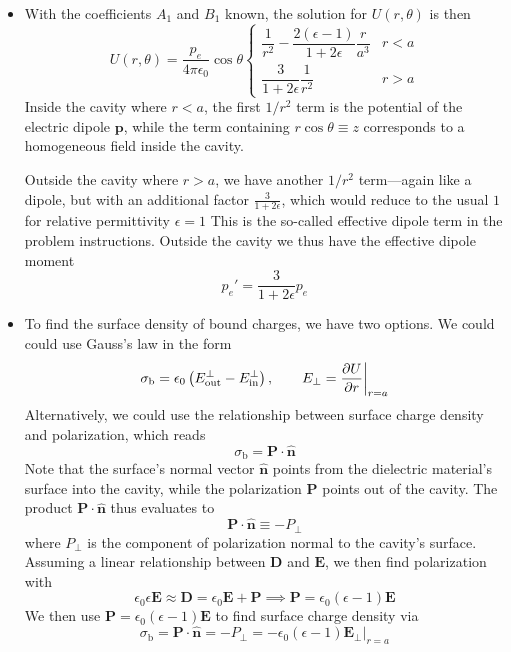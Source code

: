 \documentclass[11pt, a4paper]{article}
\renewcommand{\vec}[1]{\bm{#1}} %
\newcommand{\uvec}[1]{\hat{\vec{#1}}} %
\newcommand{\E}{\vec{E}}  %
\newcommand{\D}{\vec{D}}  %
\newcommand{\e}{\epsilon}
\newcommand{\ee}{\epsilon_{0}}  %
\newcommand{\pe}{\vec{p}}  %
\renewcommand{\P}{\vec{P}}  %
\begin{document}
\begin{itemize}
	\item With the coefficients $ A_{1} $ and $ B_{1} $ known, the solution for $ U(r, \theta) $ is then
	\begin{equation*}
		U(r, \theta) = \frac{p_{e}}{4\pi \ee}\cos \theta
		\begin{cases}
			\dfrac{1}{r^{2}} - \dfrac{2(\e - 1)}{1 + 2\e}\dfrac{r}{a^{3}} & r < a\\[2mm]
			\dfrac{3}{1 + 2\e} \dfrac{1}{r^{2}} & r > a
		\end{cases}
	\end{equation*}
	Inside the cavity where $ r < a $, the first $ 1/r^{2} $ term is the potential of the electric dipole $ \pe $, while the term containing $  r \cos \theta \equiv z $ corresponds to a homogeneous field inside the cavity. 
	
	Outside the cavity where $ r > a $, we have another $ 1/r^{2} $ term---again like a dipole, but with an additional factor $ \frac{3}{1 + 2\e} $, which would reduce to the usual $ 1 $ for relative permittivity $ \e = 1 $ This is the so-called effective dipole term in the problem instructions. Outside the cavity we thus have the effective dipole moment
	\begin{equation*}
		p_{e}' = \frac{3}{1 + 2\e}p_{e}
	\end{equation*}
	
	\item To find the surface density of bound charges, we have two options. We could could use Gauss's law in the form
	\begin{equation*}
		\sigma_{\mathrm{b}} = \ee \left(E^{\mathrm{\perp}}_{\text{out}} - E^{\mathrm{\perp}}_{\text{in}}\right), \qquad E_{\perp} = \pdv{U}{r} \bigg |_{r = a}
	\end{equation*}
	Alternatively, we could use the relationship between surface charge density and polarization, which reads
	\begin{equation*}
		\sigma_{\mathrm{b}} = \P \cdot \uvec{n}
	\end{equation*}
	Note that the surface's normal vector $ \uvec{n} $ points from the dielectric material's surface into the cavity, while the polarization $ \P $ points out of the cavity. The product $  \P \cdot \uvec{n} $ thus evaluates to
	\begin{equation*}
		 \P \cdot \uvec{n} \equiv - P_{\perp}
	\end{equation*}
	where $ P_{\perp} $ is the component of polarization normal to the cavity's surface. Assuming a linear relationship between $ \D $ and $ \E $, we then find polarization with
	\begin{equation*}
		\ee \e \E  \approx \D = \ee \E + \P \implies \P = \ee (\e - 1)\E
	\end{equation*}
	We then use $ \P = \ee (\e - 1)\E $ to find surface charge density via
	\begin{equation*}
		\sigma_{\mathrm{b}} = \P \cdot \uvec{n} = -P_{\perp} = -\ee(\e - 1)\E_{\perp}\big |_{r = a}
	\end{equation*}
\end{itemize}
\end{document}
